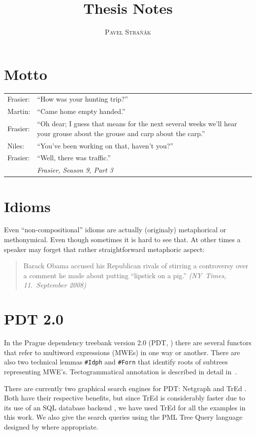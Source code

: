 \documentclass[11pt, a4paper]{article}
\title{Thesis Notes}
\author{\textsc{Pavel Straňák}}
\begin{document}
\maketitle

\section*{Motto}
\begin{tabular}{@{} lp{11cm} @{}} %
Frasier: & ``How was your hunting trip?''\\
Martin: & ``Came home empty handed.''\\
Frasier: & ``Oh dear; I guess that means for the next several weeks we'll hear your grouse about the grouse and carp about the carp.''\\
Niles: & ``You've been working on that, haven't you?''\\
Frasier: & ``Well, there was traffic.''\\
 & \raggedleft\emph{Frasier, Season 9, Part 3}\\
\end{tabular}

\section*{Idioms}
Even ``non-compositional'' idioms are actually (originaly) metaphorical or methonymical.  Even though sometimes it is hard to see that. At other times a speaker may forget that rather straightforward metaphoric aspect:

\begin{quote}
Barack Obama accused his Republican rivals of stirring a controversy over a comment he made about putting “lipstick on a pig.” \emph{(NY~Times, 11.~September 2008)}
\end{quote}


\section{PDT 2.0}\label{PDT}
In the Prague dependency treebank version 2.0 (PDT, ) there are several functors that refer to multiword expressions (MWEs) in one way or another. There are also two technical lemmas \texttt{\#Idph} and \texttt{\#Forn} that identify roots of subtrees representing MWE's. Tectogrammatical annotation is described in detail in~\citet{mikulova:2006}.

There are currently two graphical search engines for PDT: Netgraph \citep{mirovsky:2009} and TrEd \citep{pajas:tred}. Both have their respective benefits, but since TrEd is considerably faster due to its use of an SQL database backend \citep{pmltq}, we have used TrEd for all the examples in this work. We also give the search queries using the PML Tree Query language designed by \citet{pmltq} where appropriate.
\end{document}
